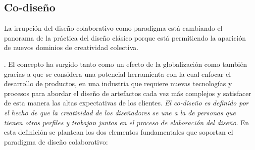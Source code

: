 \subsection{Co-diseño}

La irrupción del diseño colaborativo como paradigma está cambiando el panorama de la práctica del diseño clásico porque está permitiendo la aparición de nuevos dominios de creatividad colectiva. 

 \citep{Huerta2013}. El concepto ha surgido tanto como un efecto de la globalización como también gracias a que se considera una potencial herramienta con la cual enfocar el desarrollo de productos, en una industria que requiere nuevas tecnologías y procesos para abordar el diseño de artefactos cada vez más complejos y satisfacer de esta manera las altas expectativas de los clientes. 
\textit{El co-diseño es definido por el hecho de que la creatividad de los diseñadores se une a la de personas que tienen otros perfiles y trabajan juntas en el proceso de elaboración del diseño}.
En esta definición se plantean los dos elementos fundamentales que soportan el paradigma de diseño colaborativo:
